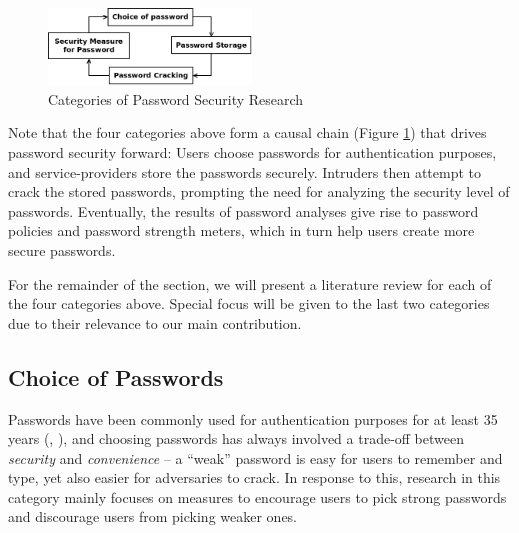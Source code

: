 \documentclass{article} %
\theoremstyle{definition}
\theoremstyle{theorem}
\theoremstyle{remark}
\theoremstyle{remark}
\begin{document}
\begin{figure}
    \vspace{-20pt}
    \begin{center}
        \includegraphics[width=0.48\textwidth]{diag/categories.png}
    \end{center}
    \vspace{-5pt}
    \caption{Categories of Password Security Research}
    \vspace{-0pt}
    \label{fig:categories}
\end{figure}

\par\quad Note that the four categories above form a causal chain (Figure \ref{fig:categories}) that drives password security forward: Users choose passwords for authentication purposes, and service-providers store the passwords securely. Intruders then attempt to crack the stored passwords, prompting the need for analyzing the security level of passwords. Eventually, the results of password analyses give rise to password policies and password strength meters, which in turn help users create more secure passwords.

\par\quad For the remainder of the section, we will present a literature review for each of the four categories above. Special focus will be given to the last two categories due to their relevance to our main contribution.


\subsection{Choice of Passwords}
\par\quad Passwords have been commonly used for authentication purposes for at least 35 years (\cite{history}, \cite{persistence}), and choosing passwords has always involved a trade-off between \emph{security} and \emph{convenience} -- a ``weak'' password is easy for users to remember and type, yet also easier for adversaries to crack. In response to this, research in this category mainly focuses on measures to encourage users to pick strong passwords and discourage users from picking weaker ones.
\end{document}
